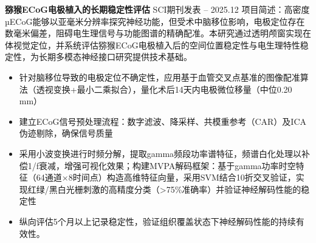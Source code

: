\textbf{猕猴ECoG电极植入的长期稳定性评估} \hfill SCI期刊发表  -- 2025.12 \titlebreak
项目简述：高密度µECoG能够以亚毫米分辨率探究神经功能，但受术中脑移位影响，电极定位存在数毫米偏差，阻碍电生理信号与功能图谱的精确配准。本研究通过透明颅窗实现在体视觉定位，并系统评估猕猴ECoG电极植入后的空间位置稳定性与电生理特性稳定性，为长期多模态神经接口研究提供技术基础。
\begin{itemize}[nosep]
    \item 针对脑移位导致的电极定位不确定性，应用基于血管交叉点基准的图像配准算法（透视变换+最小二乘拟合），量化术后14天内电极微位移量（中位0.20 mm）
    \item 建立ECoG信号预处理流程：数字滤波、降采样、共模重参考（CAR）及ICA伪迹剔除，确保信号质量
    \item 采用小波变换进行时频分解，提取gamma频段功率谱特征，频谱白化处理以补偿1/f衰减，增强可视化效果；构建MVPA解码框架：基于gamma功率时空特征（64通道×8时间点）构造高维特征向量，采用SVM结合10折交叉验证，实现红绿/黑白光栅刺激的高精度分类（>75\%准确率）并验证神经解码性能的稳定性
    \item 纵向评估5个月以上记录稳定性，验证组织覆盖状态下神经解码性能的持续有效性。
\end{itemize}
